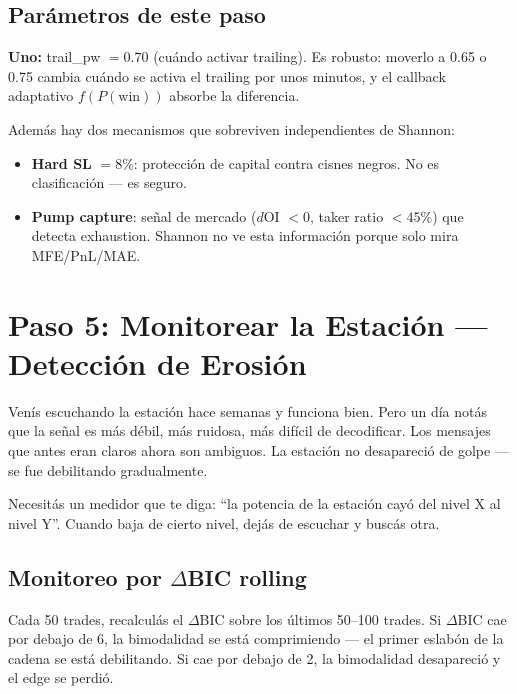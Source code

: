\documentclass[11pt,a4paper]{article}
\newcommand{\pw}{P(\text{win})}
\begin{document}
\subsection{Par\'ametros de este paso}

\textbf{Uno:} trail\_pw $= 0.70$ (cu\'ando activar trailing). Es robusto:
moverlo a 0.65 o 0.75 cambia cu\'ando se activa el trailing por unos
minutos, y el callback adaptativo $f(\pw)$ absorbe la diferencia.

Adem\'as hay dos mecanismos que sobreviven independientes de Shannon:
\begin{itemize}[leftmargin=1.5em]
\item \textbf{Hard SL} $= 8\%$: protecci\'on de capital contra cisnes negros.
  No es clasificaci\'on --- es seguro.
\item \textbf{Pump capture}: se\~nal de mercado ($d$OI $< 0$, taker ratio
  $< 45\%$) que detecta exhaustion. Shannon no ve esta informaci\'on
  porque solo mira MFE/PnL/MAE.
\end{itemize}


\section{Paso 5: Monitorear la Estaci\'on --- Detecci\'on de Erosi\'on}
\label{sec:paso5}

\begin{tcolorbox}[radio, title=La radio: la estaci\'on se debilita]
Ven\'is escuchando la estaci\'on hace semanas y funciona bien.
Pero un d\'ia not\'as que la se\~nal es m\'as d\'ebil, m\'as ruidosa,
m\'as dif\'icil de decodificar. Los mensajes que antes eran claros
ahora son ambiguos. La estaci\'on no desapareci\'o de golpe --- se
fue debilitando gradualmente.

Necesit\'as un medidor que te diga: ``la potencia de la estaci\'on
cay\'o del nivel X al nivel Y''. Cuando baja de cierto nivel, dej\'as
de escuchar y busc\'as otra.
\end{tcolorbox}

\subsection{Monitoreo por $\Delta$BIC rolling}

Cada 50 trades, recalcul\'as el $\Delta$BIC sobre los \'ultimos
50--100 trades. Si $\Delta$BIC cae por debajo de 6, la bimodalidad
se est\'a comprimiendo --- el primer eslab\'on de la cadena se est\'a
debilitando. Si cae por debajo de 2, la bimodalidad desapareci\'o
y el edge se perdi\'o.
\end{document}
